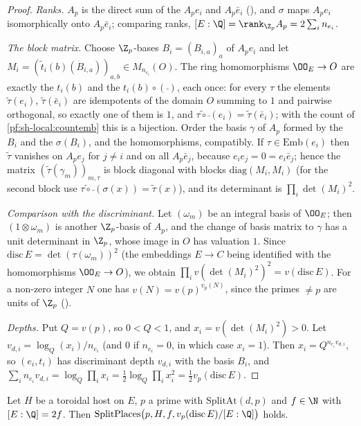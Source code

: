 \begin{proof}
\emph{Ranks.} $A_p$ is the direct sum of the $A_pe_i$ and $A_p\bar e_i$
(), and $\sigma$ maps $A_pe_i$ isomorphically onto $A_p\bar e_i$;
comparing ranks, $[E:\Q]=\rank_{\Z_p}A_p=2\sum_in_{e_i}$.

\emph{The block matrix.} Choose $\Z_p$-bases $B_i=(B_{i,a})_a$ of $A_pe_i$ and let
$M_i=(\tilde t_i(b)(B_{i,a}))_{a,b}\in M_{n_{e_i}}(O)$. The ring homomorphisms $\OO_E\to O$ are exactly the
$t_i(b)$ and the $t_i(b)\circ(\bar{\ })$, each once: for every $\tau$ the elements $\tilde\tau(e_i)$,
$\tilde\tau(\bar e_i)$ are idempotents of the domain $O$ summing to $1$ and pairwise orthogonal, so exactly one of
them is $1$, and $\widetilde{\tau\circ\bar{\ }}(e_i)=\tilde\tau(\bar e_i)$; with the count of
\cref{pf:sh-local:countemb} this is a bijection. Order the basis $\gamma$ of $A_p$ formed by the $B_i$ and the
$\sigma(B_i)$, and the homomorphisms, compatibly. If $\tau\in\mathrm{Emb}(e_i)$ then $\tilde\tau$ vanishes on $A_pe_j$
for $j\ne i$ and on all $A_p\bar e_j$, because $e_ie_j=0=e_i\bar e_j$; hence the matrix
$(\tilde\tau(\gamma_m))_{m,\tau}$ is block diagonal with blocks $\mathrm{diag}(M_i,M_i)$ (for the second block use
$\widetilde{\tau\circ\bar{\ }}(\sigma(x))=\tilde\tau(x)$), and its determinant is $\prod_i\det(M_i)^2$.

\emph{Comparison with the discriminant.} Let $(\omega_m)$ be an integral basis of $\OO_E$; then $(1\otimes\omega_m)$
is another $\Z_p$-basis of $A_p$, and the change of basis matrix to $\gamma$ has a unit determinant in $\Z_p$, whose
image in $O$ has valuation $1$. Since $\mathrm{disc}\,E=\det(\tau(\omega_m))^2$ (the embeddings $E\to C$ being
identified with the homomorphisms $\OO_E\to O$), we obtain
$\prod_iv(\det(M_i)^2)^2=v(\mathrm{disc}\,E)$. For a non-zero integer $N$ one has $v(N)=v(p)^{v_p(N)}$, since the
primes $\ne p$ are units of $\Z_p$ ().

\emph{Depths.} Put $Q=v(p)$, so $0<Q<1$, and $x_i=v(\det(M_i)^2)>0$. Let $v_{d,i}=\log_Q(x_i)/n_{e_i}$ (and $0$ if
$n_{e_i}=0$, in which case $x_i=1$). Then $x_i=Q^{n_{e_i}v_{d,i}}$, so $(e_i,t_i)$ has discriminant depth $v_{d,i}$
with the basis $B_i$, and $\sum_in_{e_i}v_{d,i}=\log_Q\prod_ix_i=\frac12\log_Q\prod_ix_i^2=\frac12v_p(\mathrm{disc}\,E)$.
\end{proof}

\begin{proposition}\label{pf:sh-local:splitplaces}
Let $H$ be a toroidal host on $E$, $p$ a prime with $\mathrm{SplitAt}(d,p)$ and $f\in\N$ with $[E:\Q]=2f$. Then
$\mathrm{SplitPlaces}\bigl(p,H,f,v_p(\mathrm{disc}\,E)/[E:\Q]\bigr)$ holds.
\end{proposition}

